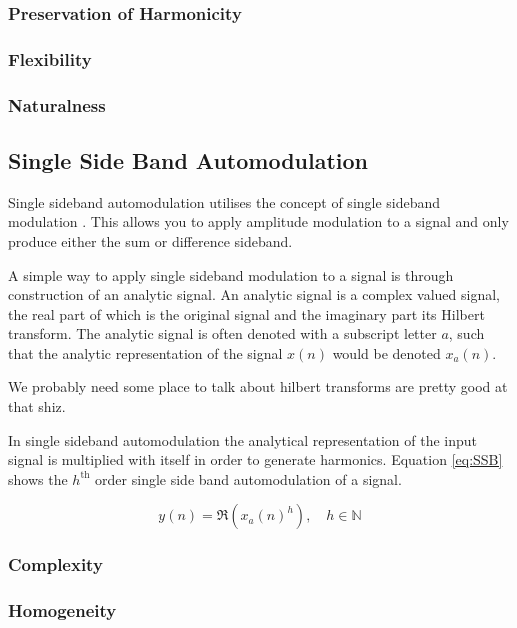 		\subsubsection*{Preservation of Harmonicity}
		\subsubsection*{Flexibility}
		\subsubsection*{Naturalness}

	\subsection{Single Side Band Automodulation}
	\label{sec:Excitation-SSB}
		Single sideband automodulation utilises the concept of single sideband modulation
		\citep{corinthios2009signals}. This allows you to apply amplitude modulation to a signal and only produce
		either the sum or difference sideband.

		A simple way to apply single sideband modulation to a signal is through construction of an analytic signal.
		An analytic signal is a complex valued signal, the real part of which is the original signal and the
		imaginary part its Hilbert transform. The analytic signal is often denoted with a subscript letter
		$a$, such that the analytic representation of the signal $x(n)$ would be denoted $x_{a}(n)$.

		\note
		{
			We probably need some place to talk about hilbert transforms \citet{oppenheim2014discrete} are
			pretty good at that shiz.
		}

		In single sideband automodulation the analytical representation of the input signal is multiplied with
		itself in order to generate harmonics. Equation \ref{eq:SSB} shows the $h^{\text{th}}$ order single side
		band automodulation of a signal.

		\begin{equation}
			y(n) = \Re \left( x_{a}(n)^{h} \right), \quad h \in \mathbb{N}
			\label{eq:SSB}
		\end{equation}

		\subsubsection*{Complexity}
		\subsubsection*{Homogeneity}
